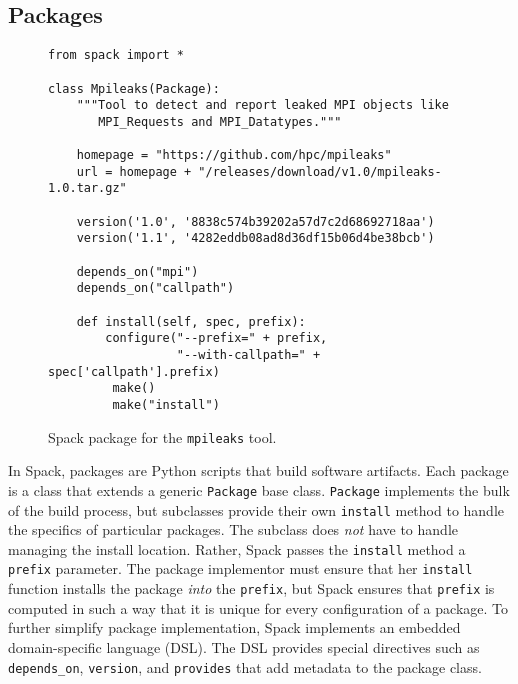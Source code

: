 
\subsection{Packages}\label{sec:packages}

\begin{figure}
\begin{verbatim}
from spack import *

class Mpileaks(Package):
    """Tool to detect and report leaked MPI objects like
       MPI_Requests and MPI_Datatypes."""

    homepage = "https://github.com/hpc/mpileaks"
    url = homepage + "/releases/download/v1.0/mpileaks-1.0.tar.gz"

    version('1.0', '8838c574b39202a57d7c2d68692718aa')
    version('1.1', '4282eddb08ad8d36df15b06d4be38bcb')

    depends_on("mpi")
    depends_on("callpath")

    def install(self, spec, prefix):
        configure("--prefix=" + prefix,
                  "--with-callpath=" + spec['callpath'].prefix)
         make()
         make("install")
\end{verbatim}
	\caption{
		Spack package for the {\tt mpileaks} tool.
		\label{fig:mpileaks}
	}
\end{figure}

In Spack, packages are Python scripts that build software artifacts.  
Each package is a class that extends a generic {\tt Package}
base class.  {\tt Package} implements the bulk of the build process, but
subclasses provide their own {\tt install} method to handle the
specifics of particular packages. The subclass does {\it not} have to
handle managing the install location.  Rather, Spack passes the {\tt install}
method a {\tt prefix} parameter.  The package implementor must ensure that
her {\tt install} function installs the package {\it into} the {\tt prefix},
but Spack ensures that {\tt prefix} is computed in such a way that it is
unique for every configuration of a package.  To further simplify 
package implementation, Spack implements an embedded domain-specific
language (DSL).
The DSL provides special directives such as {\tt depends\_on},
{\tt version}, and {\tt provides} that add metadata
to the package class.

